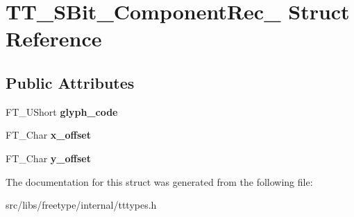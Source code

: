 \hypertarget{struct_t_t___s_bit___component_rec__}{
\section{TT\_\-SBit\_\-ComponentRec\_\- Struct Reference}
\label{struct_t_t___s_bit___component_rec__}
}
\subsection*{Public Attributes}
\begin{DoxyCompactItemize}
\item 
\hypertarget{struct_t_t___s_bit___component_rec___a357eef9c05c65034b506cdd48271e562}{
FT\_\-UShort {\bfseries glyph\_\-code}}
\label{struct_t_t___s_bit___component_rec___a357eef9c05c65034b506cdd48271e562}

\item 
\hypertarget{struct_t_t___s_bit___component_rec___a97799704aa59bf737e274289fa70ca3f}{
FT\_\-Char {\bfseries x\_\-offset}}
\label{struct_t_t___s_bit___component_rec___a97799704aa59bf737e274289fa70ca3f}

\item 
\hypertarget{struct_t_t___s_bit___component_rec___af24f91b7d5e0268a223514ad68a9a10b}{
FT\_\-Char {\bfseries y\_\-offset}}
\label{struct_t_t___s_bit___component_rec___af24f91b7d5e0268a223514ad68a9a10b}

\end{DoxyCompactItemize}


The documentation for this struct was generated from the following file:\begin{DoxyCompactItemize}
\item 
src/libs/freetype/internal/tttypes.h\end{DoxyCompactItemize}
